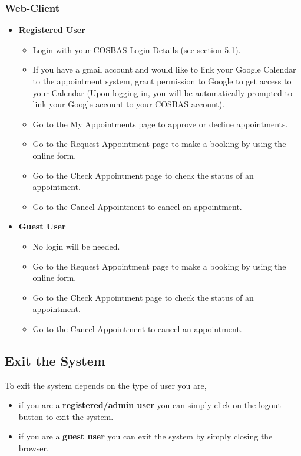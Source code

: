 \subsubsection{Web-Client}
	\begin{itemize}
		\item{\textbf{Registered User}} 
			\begin{itemize}
				\item{Login with your COSBAS Login Details (see section 5.1).} 
				\item{If you have a gmail account and would like to link your Google Calendar to the appointment system, grant permission to Google to get access to your Calendar (Upon logging in, you will be automatically prompted to link your Google account to your COSBAS account).}
				\item{Go to the My Appointments page to approve or decline appointments.}
				\item{Go to the Request Appointment page to make a booking by using the online form.}
				\item{Go to the Check Appointment  page to check the status of an appointment.}									\item{Go to the Cancel Appointment to cancel an appointment.}
			\end{itemize}

		\item{\textbf{Guest User} }
			\begin{itemize}
				\item{No login will be needed.}
				\item{Go to the Request Appointment page to make a booking by using the online form.}
				\item{Go to the Check Appointment  page to check the status of an appointment.}									\item{Go to the Cancel Appointment to cancel an appointment.}
			\end{itemize}
	\end{itemize}

\subsection{Exit the System}
To exit the system depends on the type of user you are,
	\begin{itemize}
		\item{if you are a \textbf{registered/admin user} you can simply click on the logout button to exit the system.} 
		\item{if you are a \textbf{guest user} you can exit the system by simply closing the browser.}
	\end{itemize}


